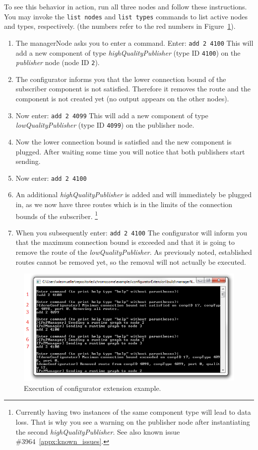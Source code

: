 \noindent To see this behavior in action, run all three nodes and follow these instructions.
You may invoke the \texttt{list nodes} and \texttt{list types} commands to list active nodes and types, respectively.
(the numbers refer to the red numbers in Figure~\ref{fig:example_configuratorExtension_execution}).
\begin{enumerate}
	\item
		The managerNode asks you to enter a command.\newline
		Enter: \texttt{add 2 4100}\newline
		This will add a new component of type \textit{highQualityPublisher} (type ID \texttt{4100}) on the \textit{publisher} node (node ID \texttt{2}).
	\item
		The configurator informs you that the lower connection bound of the subscriber component is not satisfied.
		Therefore it removes the route and the component is not created yet (no output appears on the other nodes).
	\item
		Now enter: \texttt{add 2 4099}\newline
		This will add a new component of type \textit{lowQualityPublisher} (type ID \texttt{4099}) on the publisher node.
	\item
		Now the lower connection bound is satisfied and the new component is plugged.
		After waiting some time you will notice that both publishers start sending.
	\item
		Now enter: \texttt{add 2 4100}
	\item
		An additional \textit{highQualityPublisher} is added and will immediately be plugged in,
		as we now have three routes which is in the limits of the connection bounds of the subscriber.%
		\footnote{Currently having two instances of the same component type will lead to data loss.
		That is why you see a warning on the publisher node after instantiating the second \textit{highQualityPublisher}.
		See also known issue \#3964~\ref{appx:known_issues}.}
	\item
		When you subsequently enter: \texttt{add 2 4100}\newline
		The configurator will inform you that the maximum connection bound is exceeded and
		that it is going to remove the route of the \textit{lowQualityPublisher}.
		As previously noted, established routes cannot be removed yet, so the removal will not actually be executed.
\end{enumerate}

\begin{figure}[htpb]
	\centering
	\includegraphics[scale=0.8]{figures/example_configuratorExtension_execution.png}
	\caption{Execution of configurator extension example.}
	\label{fig:example_configuratorExtension_execution}
\end{figure}
